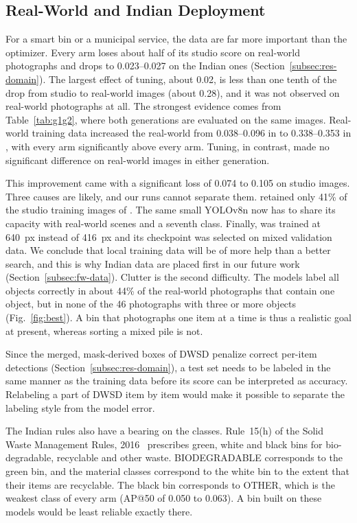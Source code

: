 \subsection{Real-World and Indian Deployment}
\label{subsec:deployment}

For a smart bin or a municipal service, the data are far more important than the optimizer. Every arm loses about half of its studio score on real-world photographs and drops to 0.023--0.027 \mapfifty on the Indian ones (Section~\ref{subsec:res-domain}). The largest effect of tuning, about 0.02, is less than one tenth of the drop from studio to real-world images (about 0.28), and it was not observed on real-world photographs at all. The strongest evidence comes from Table~\ref{tab:g1g2}, where both generations are evaluated on the same images. Real-world training data increased the real-world \mapfifty from 0.038--0.096 in \genone to 0.338--0.353 in \gentwo, with every \gentwo arm significantly above every \genone arm. Tuning, in contrast, made no significant difference on real-world images in either generation.

This improvement came with a significant loss of 0.074 to 0.105 on studio images. Three causes are likely, and our runs cannot separate them. \gentwo retained only 41\% of the studio training images of \genone. The same small YOLOv8n now has to share its capacity with real-world scenes and a seventh class. Finally, \gentwo was trained at 640~px instead of 416~px and its checkpoint was selected on mixed validation data. We conclude that local training data will be of more help than a better search, and this is why Indian data are placed first in our future work (Section~\ref{subsec:fw-data}). Clutter is the second difficulty. The models label all objects correctly in about 44\% of the real-world photographs that contain one object, but in none of the 46 photographs with three or more objects (Fig.~\ref{fig:best}). A bin that photographs one item at a time is thus a realistic goal at present, whereas sorting a mixed pile is not.

Since the merged, mask-derived boxes of DWSD penalize correct per-item detections (Section~\ref{subsec:res-domain}), a test set needs to be labeled in the same manner as the training data before its score can be interpreted as accuracy. Relabeling a part of DWSD item by item would make it possible to separate the labeling style from the model error.

The Indian rules also have a bearing on the classes. Rule~15(h) of the Solid Waste Management Rules, 2016~\cite{moefcc2016solid} prescribes green, white and black bins for bio-degradable, recyclable and other waste. BIODEGRADABLE corresponds to the green bin, and the material classes correspond to the white bin to the extent that their items are recyclable. The black bin corresponds to OTHER, which is the weakest class of every arm (AP@50 of 0.050 to 0.063). A bin built on these models would be least reliable exactly there.

